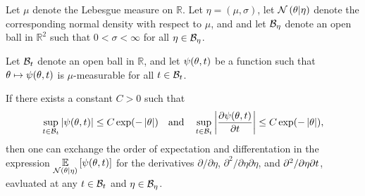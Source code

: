 \begin{lem}
%
Let $\mu$ denote the Lebesgue measure on $\mathbb{R}$. Let $\eta = (\mu,
\sigma)$, let $\mathcal{N}\left(\theta \vert \eta\right)$ denote the corresponding normal
density with respect to $\mu$, and and let $\mathcal{B}_\eta$ denote an open ball in
$\mathbb{R}^2$ such that $0 < \sigma < \infty$ for all $\eta \in \mathcal{B}_\eta$.

Let $\mathcal{B}_t$ denote an open ball in $\mathbb{R}$, and let $\psi(\theta, t)$
be a function such that $\theta \mapsto \psi(\theta, t)$ is $\mu$-measurable
for all $t \in \mathcal{B}_t$.

If there exists a constant $C > 0$ such that
%
\begin{align*}
%
\sup_{\t \in \ball_\t} \abs{\psi(\theta, \t)}
    \le C \exp(-\abs{\theta})
\mathand
\sup_{\t \in \ball_\t}
    \abs{\frac{\partial \psi(\theta, \t)}{\partial \t}}
    \le C \exp(-\abs{\theta}),
%
\end{align*}
%
then one can exchange the order of expectation and differentation in the
expression $\underset{\mathcal{N}\left(\theta \vert \eta\right)}{\mathbb{E}}\left[\psi(\theta, t)\right]$ for the
derivatives $\partial / \partial \eta$, $\partial^2 / \partial \eta \partial
\eta$, and $\partial^2 / \partial \eta  \partial t$, eavluated at any $t \in
\mathcal{B}_t$ and $\eta \in \mathcal{B}_\eta$.

\end{lem}





